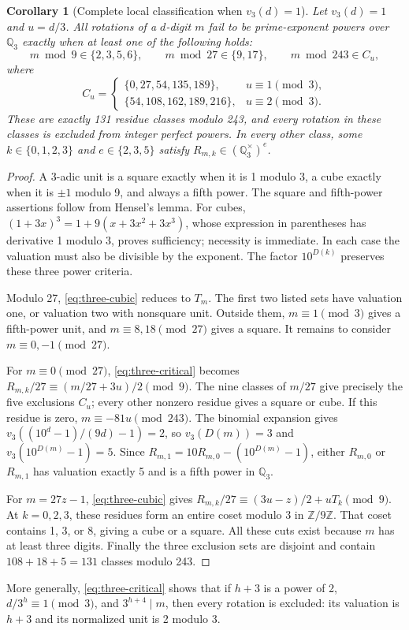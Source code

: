\documentclass[10pt]{article}
\newtheorem{corollary}{Corollary}
\newcommand{\Z}{\mathbb Z}
\newcommand{\Q}{\mathbb Q}
\begin{document}
\begin{corollary}[Complete local classification when $v_3(d)=1$]\label{cor:three-complete}
Let $v_3(d)=1$ and $u=d/3$. All rotations of a $d$-digit $m$ fail to be
prime-exponent powers over $\Q_3$ exactly when at least one of the following holds:
\[
 m\bmod9\in\{2,3,5,6\},\qquad m\bmod27\in\{9,17\},\qquad
 m\bmod243\in C_u,
\]
where
\[
 C_u=\begin{cases}
 \{0,27,54,135,189\},&u\equiv1\pmod3,\\
 \{54,108,162,189,216\},&u\equiv2\pmod3.
 \end{cases}
\]
These are exactly 131 residue classes modulo 243, and every rotation in
these classes is excluded from integer perfect powers.
In every other class, some $k\in\{0,1,2,3\}$ and $e\in\{2,3,5\}$ satisfy
$R_{m,k}\in(\Q_3^\times)^e$.
\end{corollary}
\begin{proof}
A 3-adic unit is a square exactly when it is 1 modulo 3, a cube exactly
when it is $\pm1$ modulo 9, and always a fifth power.
The square and fifth-power assertions follow from Hensel's lemma.
For cubes, $(1+3x)^3=1+9(x+3x^2+3x^3)$, whose expression in parentheses
has derivative 1 modulo 3, proves sufficiency; necessity is immediate.
In each case the valuation must also be divisible by the exponent.
The factor $10^{D(k)}$ preserves these three power criteria.

Modulo 27, \eqref{eq:three-cubic} reduces to $T_m$.
The first two listed sets have valuation one, or valuation two with
nonsquare unit. Outside them, $m\equiv1\pmod3$ gives a fifth-power unit,
and $m\equiv8,18\pmod{27}$ gives a square. It remains to consider
$m\equiv0,-1\pmod{27}$.

For $m\equiv0\pmod{27}$, \eqref{eq:three-critical} becomes
$R_{m,k}/27\equiv(m/27+3u)/2\pmod9$.
The nine classes of $m/27$ give precisely the five exclusions $C_u$;
every other nonzero residue gives a square or cube.
If this residue is zero, $m\equiv-81u\pmod{243}$.
The binomial expansion gives
$v_3((10^d-1)/(9d)-1)=2$, so $v_3(D(m))=3$ and
$v_3(10^{D(m)}-1)=5$.
Since $R_{m,1}=10R_{m,0}-(10^{D(m)}-1)$, either $R_{m,0}$ or $R_{m,1}$
has valuation exactly 5 and is a fifth power in $\Q_3$.

For $m=27z-1$, \eqref{eq:three-cubic} gives
$R_{m,k}/27\equiv(3u-z)/2+uT_k\pmod9$.
At $k=0,2,3$, these residues form an entire coset modulo 3 in $\Z/9\Z$.
That coset contains 1, 3, or 8, giving a cube or a square.
All these cuts exist because $m$ has at least three digits.
Finally the three exclusion sets are disjoint and contain
$108+18+5=131$ classes modulo 243.
\end{proof}
More generally, \eqref{eq:three-critical} shows that if $h+3$ is a power of 2,
$d/3^h\equiv1\pmod3$, and $3^{h+4}\mid m$, then every rotation is excluded:
its valuation is $h+3$ and its normalized unit is 2 modulo 3.
\end{document}
